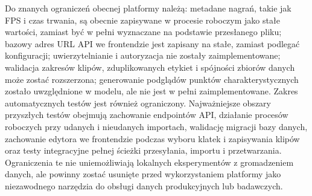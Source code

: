 Do znanych ograniczeń obecnej platformy należą: metadane nagrań, takie jak FPS
 i czas trwania, są obecnie zapisywane w procesie roboczym jako stałe wartości,
zamiast być w pełni wyznaczane na podstawie przesłanego pliku; bazowy adres URL
API we frontendzie jest zapisany na stałe, zamiast podlegać konfiguracji;
uwierzytelnianie i autoryzacja nie zostały zaimplementowane; walidacja zakresów
klipów, zduplikowanych etykiet i spójności zbiorów danych może zostać rozszerzona;
generowanie podglądów punktów charakterystycznych zostało uwzględnione w modelu,
ale nie jest w pełni zaimplementowane. Zakres automatycznych testów jest również
ograniczony. Najważniejsze obszary przyszłych testów obejmują zachowanie
endpointów API, działanie procesów roboczych przy udanych i nieudanych importach,
walidację migracji bazy danych, zachowanie edytora we frontendzie podczas wyboru
klatek i zapisywania klipów oraz testy integracyjne pełnej ścieżki przesyłania,
importu i przetwarzania. Ograniczenia te nie uniemożliwiają lokalnych eksperymentów
z gromadzeniem danych, ale powinny zostać usunięte przed wykorzystaniem platformy
jako niezawodnego narzędzia do obsługi danych produkcyjnych lub badawczych.

